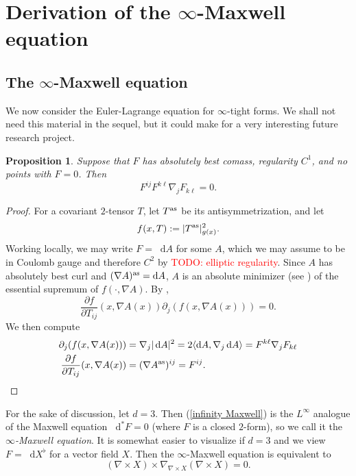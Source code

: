 \documentclass[reqno,11pt]{amsart}
\newcommand*\dif{\mathop{}\!\mathrm{d}}
\newcommand{\dfn}[1]{\emph{#1}\index{#1}}
\newtheorem{proposition}[theorem]{Proposition}
\theoremstyle{definition}
\numberwithin{equation}{section}
\newcommand\todo[1]{\textcolor{red}{TODO: #1}}
\begin{document}
\section{Derivation of the \texorpdfstring{$\infty$-Maxwell}{infinity-Maxwell} equation}

\subsection{The \texorpdfstring{$\infty$-Maxwell equation}{infinity-Maxwell equation}}
We now consider the Euler-Lagrange equation for $\infty$-tight forms.
We shall not need this material in the sequel, but it could make for a very interesting future research project.

\begin{proposition}
Suppose that $F$ has absolutely best comass, regularity $C^1$, and no points with $F = 0$. Then
\begin{equation}\label{infinity Maxwell}
	F^{ij} F^{k\ell} \nabla_j F_{k \ell} = 0.
\end{equation}
\end{proposition}
\begin{proof}
For a covariant $2$-tensor $T$, let $T^{\rm as}$ be its antisymmetrization, and let
$$f(x, T) := |T^{\rm as}|_{g(x)}^2.$$
Working locally, we may write $F = \dif A$ for some $A$, which we may assume to be in Coulomb gauge and therefore $C^2$ by \todo{elliptic regularity}.
Since $A$ has absolutely best curl and $(\nabla A)^{\rm as} = \dif A$, $A$ is an absolute minimizer (see \cite[Definition 5.1]{Barron2001}) of the essential supremum of $f(\cdot, \nabla A)$.
By \cite[Theorem 5.2]{Barron2001},
\begin{equation}\label{ELA}
	\frac{\partial f}{\partial T_{ij}}(x, \nabla A(x)) \partial_j (f(x, \nabla A(x))) = 0.
\end{equation}
We then compute
\begin{align*}
\partial_j (f(x, \nabla A(x))) &= \nabla_j |\dif A|^2 = 2 \langle \dif A, \nabla_j \dif A\rangle = F^{k\ell} \nabla_j F_{k\ell} \\
\frac{\partial f}{\partial T_{ij}}(x, \nabla A(x)) &= (\nabla A^{\rm as})^{ij} = F^{ij}. \qedhere
\end{align*}
\end{proof}

For the sake of discussion, let $d = 3$.
Then (\ref{infinity Maxwell}) is the $L^\infty$ analogue of the Maxwell equation $\dif^* F = 0$ (where $F$ is a closed $2$-form), so we call it the \dfn{$\infty$-Maxwell equation}.
It is somewhat easier to visualize if $d = 3$ and we view $F = \dif X^\flat$ for a vector field $X$.
Then the $\infty$-Maxwell equation is equivalent to
$$(\nabla \times X) \times \nabla_{\nabla \times X} (\nabla \times X) = 0.$$

\printbibliography
\end{document}
